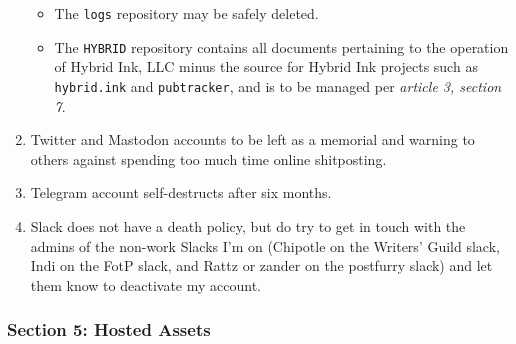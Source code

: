 \begin{enumerate}
  \begin{itemize}
  \tightlist
  \item
    The \texttt{logs} repository may be safely deleted.
  \item
    The \texttt{HYBRID} repository contains all documents pertaining to the operation of Hybrid Ink, LLC minus the source for Hybrid Ink projects such as \texttt{hybrid.ink} and \texttt{pubtracker}, and is to be managed per \emph{article 3, section 7}.
  \end{itemize}
\item
  Twitter and Mastodon accounts to be left as a memorial and warning to others against spending too much time online shitposting.
\item
  Telegram account self-destructs after six months.
\item
  Slack does not have a death policy, but do try to get in touch with the admins of the non-work Slacks I'm on (Chipotle on the Writers' Guild slack, Indi on the FotP slack, and Rattz or zander on the postfurry slack) and let them know to deactivate my account.
\end{enumerate}

\subsubsection*{Section 5: Hosted Assets}\label{section-5-hosted-assets}

